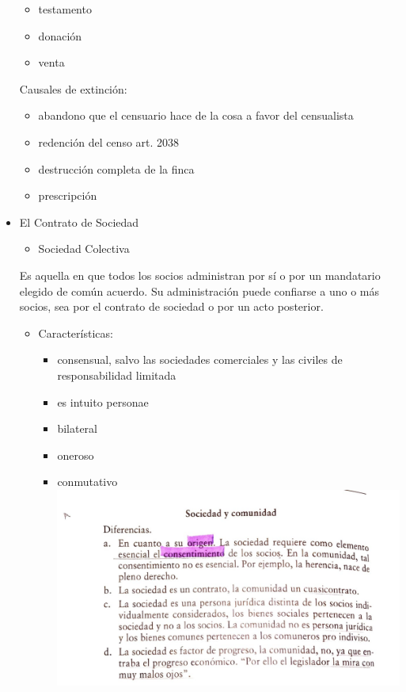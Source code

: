 \documentclass[]{article}
\providecommand{\tightlist}{%
  \setlength{\itemsep}{0pt}\setlength{\parskip}{0pt}}
\begin{document}
\begin{itemize}
  \begin{itemize}
  \tightlist
  \item
    testamento
  \item
    donación
  \item
    venta
  \end{itemize}

  Causales de extinción:

  \begin{itemize}
  \tightlist
  \item
    abandono que el censuario hace de la cosa a favor del censualista
  \item
    redención del censo art. 2038
  \item
    destrucción completa de la finca
  \item
    prescripción
  \end{itemize}
\item
  El Contrato de Sociedad

  \begin{itemize}
  \tightlist
  \item
    Sociedad Colectiva
  \end{itemize}

  Es aquella en que todos los socios administran por sí o por un
  mandatario elegido de común acuerdo. Su administración puede confiarse
  a uno o más socios, sea por el contrato de sociedad o por un acto
  posterior.

  \begin{itemize}
  \tightlist
  \item
    Características:

    \begin{itemize}
    \tightlist
    \item
      consensual, salvo las sociedades comerciales y las civiles de
      responsabilidad limitada
    \item
      es intuito personae
    \item
      bilateral
    \item
      oneroso
    \item
      conmutativo \includegraphics{dsc.jpeg}
    \end{itemize}
  \end{itemize}


\end{itemize}
\end{document}
